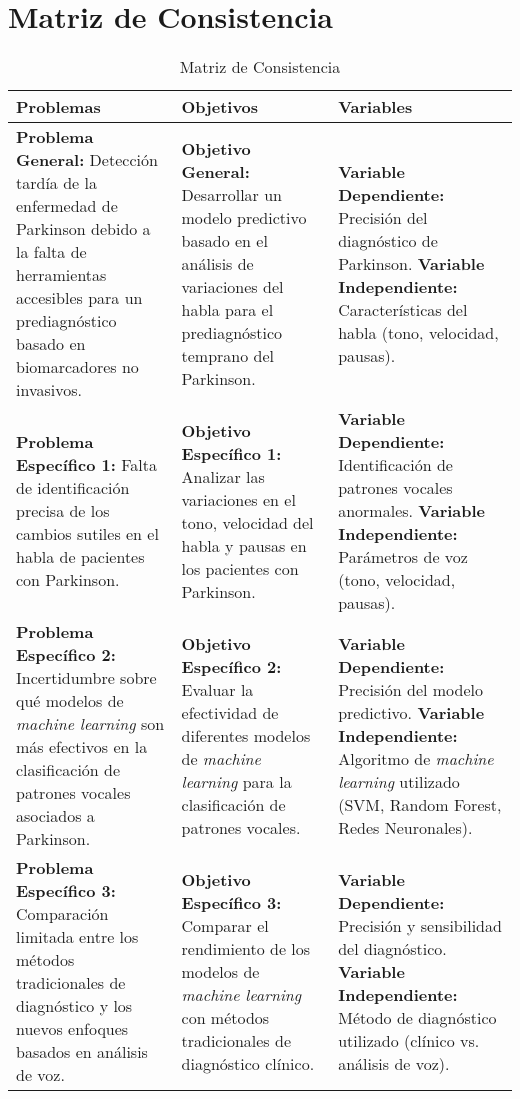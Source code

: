 \documentclass[a4paper,12pt]{article}
\begin{document}
\section{Matriz de Consistencia}

\begin{table}[h!]
\centering
\begin{tabular}{|p{5cm}|p{5cm}|p{5cm}|}
\hline
\textbf{Problemas}                                      & \textbf{Objetivos}                             & \textbf{Variables}                               \\ \hline
\textbf{Problema General:} Detección tardía de la enfermedad de Parkinson debido a la falta de herramientas accesibles para un prediagnóstico basado en biomarcadores no invasivos. & \textbf{Objetivo General:} Desarrollar un modelo predictivo basado en el análisis de variaciones del habla para el prediagnóstico temprano del Parkinson. & \textbf{Variable Dependiente:} Precisión del diagnóstico de Parkinson. \newline \textbf{Variable Independiente:} Características del habla (tono, velocidad, pausas). \\ \hline
\textbf{Problema Específico 1:} Falta de identificación precisa de los cambios sutiles en el habla de pacientes con Parkinson. & \textbf{Objetivo Específico 1:} Analizar las variaciones en el tono, velocidad del habla y pausas en los pacientes con Parkinson. & \textbf{Variable Dependiente:} Identificación de patrones vocales anormales. \newline \textbf{Variable Independiente:} Parámetros de voz (tono, velocidad, pausas). \\ \hline
\textbf{Problema Específico 2:} Incertidumbre sobre qué modelos de \textit{machine learning} son más efectivos en la clasificación de patrones vocales asociados a Parkinson. & \textbf{Objetivo Específico 2:} Evaluar la efectividad de diferentes modelos de \textit{machine learning} para la clasificación de patrones vocales. & \textbf{Variable Dependiente:} Precisión del modelo predictivo. \newline \textbf{Variable Independiente:} Algoritmo de \textit{machine learning} utilizado (SVM, Random Forest, Redes Neuronales). \\ \hline
\textbf{Problema Específico 3:} Comparación limitada entre los métodos tradicionales de diagnóstico y los nuevos enfoques basados en análisis de voz. & \textbf{Objetivo Específico 3:} Comparar el rendimiento de los modelos de \textit{machine learning} con métodos tradicionales de diagnóstico clínico. & \textbf{Variable Dependiente:} Precisión y sensibilidad del diagnóstico. \newline \textbf{Variable Independiente:} Método de diagnóstico utilizado (clínico vs. análisis de voz). \\ \hline
\end{tabular}
\caption{Matriz de Consistencia}
\end{table}
\end{document}
